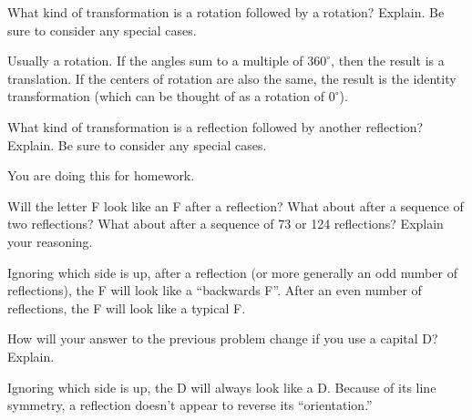 \documentclass[nooutcomes]{ximera}
\begin{document}
\begin{question}
What kind of transformation is a rotation followed by a rotation?  Explain.  Be sure to consider any special cases.   
\begin{freeResponse}
\begin{hint}
Usually a rotation.  If the angles sum to a multiple of $360^\circ$, then the result is a translation.  If the centers of rotation are also the same, the result is the identity transformation (which can be thought of as a rotation of $0^\circ$).
\end{hint}
\end{freeResponse}
\end{question}

\begin{question}
What kind of transformation is a reflection followed by another reflection?  Explain.  Be sure to consider any special cases.  
\begin{freeResponse}
\begin{hint}
You are doing this for homework.  
\end{hint}
\end{freeResponse}
\end{question}

\begin{question}
Will the letter F look like an F after a reflection?  What about after a sequence of two reflections?  What about after a sequence of 73 or 124 reflections?  Explain your reasoning.  
\begin{freeResponse}
\begin{hint}
Ignoring which side is up, after a reflection (or more generally an odd number of reflections), the F will look like a ``backwards F''.  After an even number of reflections, the F will look like a typical F.  
\end{hint}
\end{freeResponse}
\end{question}

\begin{question}
How will your answer to the previous problem change if you use a capital D?  Explain.  
\begin{freeResponse}
\begin{hint}
Ignoring which side is up, the D will always look like a D.  Because of its line symmetry, a reflection doesn't appear to reverse its ``orientation.''  
\end{hint}
\end{freeResponse}
\end{question}
\end{document}
